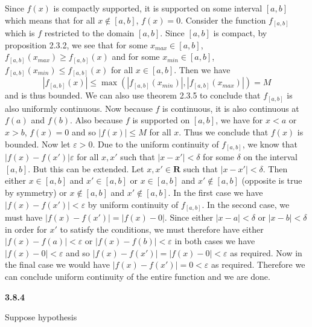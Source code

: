 \documentclass[12pt]{article}
\begin{document}
Since $f(x)$ is compactly supported, it is supported on some interval $[a,b]$ which means that for all $x\notin[a,b]$, $f(x) = 0$. Consider the function $f_{[a,b]}$ which is $f$ restricted to the domain $[a,b]$. Since $[a,b]$ is compact, by proposition 2.3.2, we see that for some $x_{max}\in [a,b]$, $f_{[a,b]}(x_{max}) \geq f_{[a,b]}(x)$ and for some $x_{min}\in [a,b]$, $f_{[a,b]}(x_{min})\leq f_{[a,b]}(x)$ for all $x\in [a,b]$. Then we have \[|f_{[a,b]}(x)| \leq \max(|f_{[a,b]}(x_{min})|,|f_{[a,b]}(x_{max})|) = M\] and is thus bounded. We can also use theorem 2.3.5 to conclude that $f_{[a,b]}$ is also uniformly continuous. Now because $f$ is continuous, it is also continuous at $ f(a)$ and $f(b)$. Also because $f$ is supported on $[a,b]$, we have for $x<a$ or $x>b$, $f(x) = 0$ and so $ |f(x)| \leq M$ for all $x$. Thus we conclude that $f(x)$ is bounded. Now let $\varepsilon>0 $. Due to the uniform continuity of $f_{[a,b]}$, we know that $|f(x)-f(x')| \varepsilon$ for all $ x,x'$ such that $|x-x'| <\delta$ for some $\delta$ on the interval $[a,b]$. But this can be extended. Let $x,x'\in \textbf{R}$ such that $ |x-x'| < \delta$. Then either $ x\in [a,b]$ and $x'\in [a,b]$ or $x\in[a,b]$ and $x'\notin [a,b]$ (opposite is true by symmetry) or $x\notin[a,b]$ and $x'\notin[a,b]$. In the first case we have $ |f(x)-f(x')| < \varepsilon$ by uniform continuity of $f_{[a,b]}$. In the second case, we must have $ |f(x)-f(x')| = |f(x)-0|$. Since either $ |x-a| < \delta$ or $|x-b| < \delta$ in order for $x'$ to satisfy the conditions, we must therefore have either $ |f(x)-f(a)| < \varepsilon$ or $ |f(x)-f(b)| < \varepsilon$ in both cases we have $|f(x)-0| < \varepsilon$ and so $|f(x)-f(x')| = |f(x)-0| < \varepsilon$ as required. Now in the final case we would have $|f(x)-f(x')| = 0 < \varepsilon$ as required. Therefore we can conclude uniform continuity of the entire function and we are done.

\textbf{3.8.4}

Suppose hypothesis 
\end{document}
